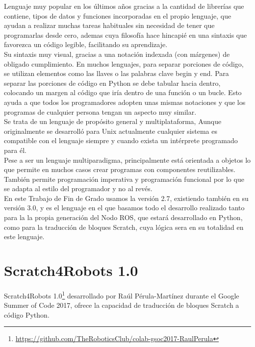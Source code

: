 Lenguaje muy popular en los últimos años gracias a la cantidad de librerías que contiene, tipos de datos y funciones incorporadas en el propio lenguaje, que ayudan a realizar muchas tareas habituales sin necesidad de tener que programarlas desde cero, ademas cuya filosofía hace hincapié en una sintaxis que favorezca un código legible, facilitando su aprendizaje.\\

Su sintaxis muy visual, gracias a una notación indexada (con márgenes) de obligado cumplimiento. En muchos lenguajes, para separar porciones de código, se utilizan elementos como las llaves o las palabras clave begin y end. Para separar las porciones de código en Python se debe tabular hacia dentro, colocando un margen al código que iría dentro de una función o un bucle. Esto ayuda a que todos los programadores adopten unas mismas notaciones y que los programas de cualquier persona tengan un aspecto muy similar.\\

Se trata de un lenguaje de propósito general y multiplataforma, Aunque originalmente se desarrolló para Unix actualmente cualquier sistema es compatible con el lenguaje siempre y cuando exista un intérprete programado para él.\\

Pese a ser un lenguaje multiparadigma, principalmente está orientada a objetos lo que permite en muchos casos crear programas con componentes reutilizables. También permite programación imperativa y programación funcional por lo que se adapta al estilo del programador y no al revés.\\

En este Trabajo de Fin de Grado usamos la versión 2.7, existiendo también en su versión 3.0, y es el lenguaje en el que basamos todo el desarrollo realizado tanto para la  la propia generación del Nodo ROS, que estará desarrollado en Python, como para la traducción de bloques Scratch, cuya lógica sera en su totalidad en este lenguaje.\\

\section{Scratch4Robots 1.0}
Scratch4Robots 1.0\footnote{\url{https://github.com/TheRoboticsClub/colab-gsoc2017-RaulPerula}} desarrollado por Raúl Pérula-Martínez durante el Google Summer of Code 2017, ofrece la capacidad de traducción de bloques Scratch a código Python.\\

